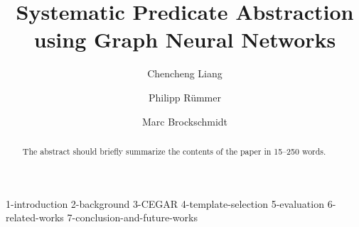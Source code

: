 \documentclass[runningheads]{llncs}
\begin{document}
%
\title{Systematic Predicate Abstraction using Graph Neural Networks}
%
%
\author{Chencheng Liang%
\and
Philipp Rümmer%
\and
Marc Brockschmidt%
}
%
%




%
\maketitle              %
%
\begin{abstract}
The abstract should briefly summarize the contents of the paper in
15--250 words.

\end{abstract}
%
%
%
% 
% 
% 
% 
% 
% 


{1-introduction}
{2-background}
{3-CEGAR}
{4-template-selection}
{5-evaluation}
{6-related-works}
{7-conclusion-and-future-works}




\end{document}
